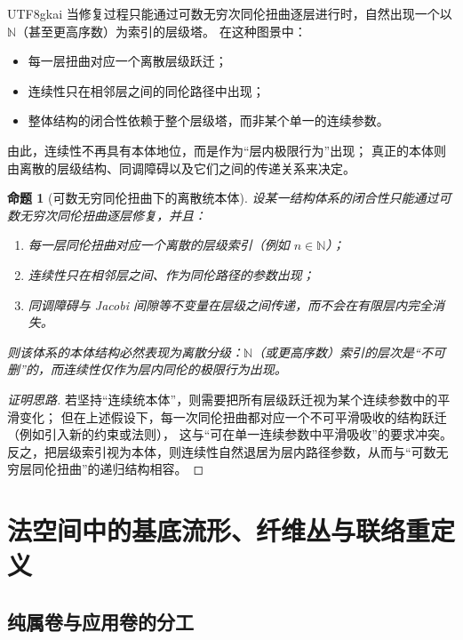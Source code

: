 \documentclass[12pt]{article}
\newtheorem{proposition}{命题}[section]
\begin{document}
\begin{CJK*}{UTF8}{gkai}
当修复过程只能通过可数无穷次同伦扭曲逐层进行时，自然出现一个以 $\mathbb{N}$（甚至更高序数）为索引的层级塔。
在这种图景中：
\begin{itemize}
  \item 每一层扭曲对应一个离散层级跃迁；
  \item 连续性只在相邻层之间的同伦路径中出现；
  \item 整体结构的闭合性依赖于整个层级塔，而非某个单一的连续参数。
\end{itemize}

由此，连续性不再具有本体地位，而是作为“层内极限行为”出现；
真正的本体则由离散的层级结构、同调障碍以及它们之间的传递关系来决定。

\begin{proposition}[可数无穷同伦扭曲下的离散统本体]
设某一结构体系的闭合性只能通过可数无穷次同伦扭曲逐层修复，并且：
\begin{enumerate}
  \item 每一层同伦扭曲对应一个离散的层级索引（例如 $n\in\mathbb{N}$）；
  \item 连续性只在相邻层之间、作为同伦路径的参数出现；
  \item 同调障碍与 Jacobi 间隙等不变量在层级之间传递，而不会在有限层内完全消失。
\end{enumerate}
则该体系的本体结构必然表现为离散分级：$\mathbb{N}$（或更高序数）索引的层次是“不可删”的，而连续性仅作为层内同伦的极限行为出现。
\end{proposition}

\begin{proof}[证明思路]
若坚持“连续统本体”，则需要把所有层级跃迁视为某个连续参数中的平滑变化；
但在上述假设下，每一次同伦扭曲都对应一个不可平滑吸收的结构跃迁（例如引入新的约束或法则），
这与“可在单一连续参数中平滑吸收”的要求冲突。
反之，把层级索引视为本体，则连续性自然退居为层内路径参数，从而与“可数无穷层同伦扭曲”的递归结构相容。
\end{proof}


\section{法空间中的基底流形、纤维丛与联络重定义}

\subsection{纯属卷与应用卷的分工}


\end{CJK*}
\end{document}
